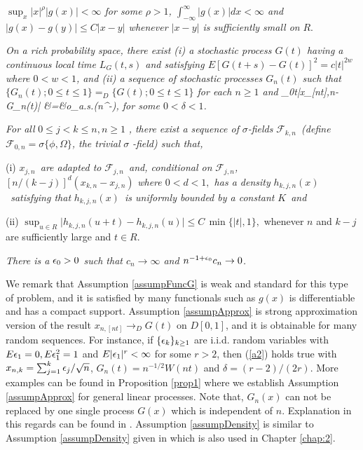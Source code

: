 \begin{assump}  \textit{
$\sup_x |x|^{\rho} |g(x)|<\infty$ for some $\rho > 1$, $\int_{-\infty}^{\infty}|g(x)|dx<\infty$ \textit{and }\
$|g(x)-g(y)|\le C|x-y|$ whenever  $|x-y|$ is sufficiently small on }$R$.
\end{assump}


\begin{assump} 
 \textit{On a rich probability space, there exist (i) a stochastic process $G(t)$ having a continuous local time $L_G(t,s)$ and satisfying $E[G(t+s) -G(t)]^2 = c|t|^{2w}$ where $0 < w < 1$, and (ii) a sequence of stochastic processes $G_n(t)$  such that $\{G_n(t); 0 \le t \le 1\} =_D \{G(t); 0 \le t \le 1\}$ for each $n \ge 1$ and 
\be
 \sup_{0\le t}|x_{[nt],n}-G_n(t)| &=&o_{a.s.}(n^{-\delta}),
 \la {a2}
\ee
for some $0<\delta<1$. }
\end{assump}

\begin{assump} 
 \textit{For all }$0\leq j<k\leq n,n\geq 1$%
\textit{, there exist  a
sequence of }$\sigma $\textit{-fields }${\mathcal F}_{k,n}$\textit{\ (define }$%
{\mathcal F}_{0,n}=\sigma \{\phi ,\Omega \}$\textit{, the trivial }$\sigma $\textit{%
-field) such that,}

(i) $x_{j,n}$\textit{\ are adapted to }${\mathcal F}_{j,n}$\textit{\
and, conditional on }${\mathcal F}_{j,n}$\textit{,
}$[n/(k-j)]^d(x_{k,n}-x_{j,n})$\textit{ where $0<d<1,$ has a density
}$h_{k,j,n}(x)$\textit{\ satisfying that }$h_{k,j,n}(x)$\textit{\ is
uniformly bounded by a constant }$K$\textit{\ and }%

(ii) $  \sup_{u\in R}\big|h_{k,j,n}(u+t)-h_{k,j,n}(u)\big|\le C\, \min\{|t|, 1\},$
whenever $n$ and $k-j$ are sufficiently large and $t\in R$.
\end{assump}

\begin{assump} 
 \textit{There is a $\epsilon_0>0$ such that $c_n\to\infty$ and $n^{-1+\epsilon_0}c_n\to 0$. }
\end{assump}

We remark that Assumption \ref{assumpFuncG} is weak and standard
  for this type of problem, and it is satisfied by many functionals such as $g(x)$ is differentiable and has a compact support. Assumption \ref{assumpApprox} is strong approximation version of the result $x_{n, [nt]}\to_D G(t)$ on $D[0,1]$, and it is obtainable for many random sequences. For instance,  if $\{\epsilon_k\}_{k\ge 1}$ are i.i.d. random variables with $E\epsilon_1=0, E\epsilon_1^2=1$ and $E|\epsilon_1|^{r}<\infty$
  for some $r>2$, then (\ref {a2}) holds true with $x_{n,k}=\sum_{j=1}^k\epsilon_j/\sqrt n$, $G_n(t) = n^{-1/2} W(nt)$ and $\delta=(r - 2) / (2r)$. More examples can be found in Proposition \ref{prop1} where we establish  Assumption \ref{assumpApprox} for general linear processes. Note that, $G_n(x)$ can not be replaced by one single process $G(x)$ which is independent of $n$. Explanation in this regards can be found in \cite{csorgorevesz1981}.
  Assumption \ref{assumpDensity} is  similar to Assumption \ref{assumpDensity} given in \cite{wangphillips2010a} which is also used in Chapter \ref{chap:2}.



